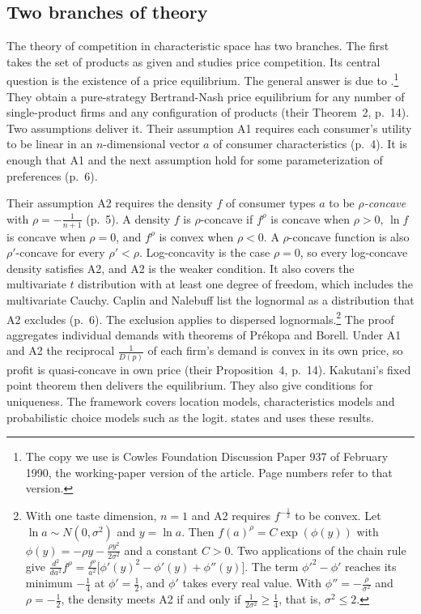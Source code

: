 \subsection{Two branches of theory}\label{sec:06-branches}

The theory of competition in characteristic space has two branches. The first takes the set of products as
given and studies price competition. Its central question is the existence of a price equilibrium. The
general answer is due to \citet{CaplinNalebuff1991}.\footnote{The copy we use is Cowles Foundation Discussion Paper
937 of February 1990, the working-paper version of the article. Page numbers refer to that version.} They obtain a
pure-strategy Bertrand-Nash price equilibrium for any number of single-product firms and any configuration of
products (their Theorem~2, p.~14). Two assumptions deliver it. Their assumption A1 requires each consumer's utility
to be linear in an $n$-dimensional vector $a$ of consumer characteristics (p.~4). It is enough that A1 and the
next assumption hold for some parameterization of preferences (p.~6).

Their assumption A2 requires the density $f$ of consumer types $a$ to be \emph{$\rho$-concave} with
$\rho = -\frac{1}{n+1}$ (p.~5). A density $f$ is $\rho$-concave if $f^\rho$ is concave when $\rho > 0$, $\ln f$ is
concave when $\rho = 0$, and $f^\rho$ is convex when $\rho < 0$. A $\rho$-concave function is also $\rho'$-concave for
every $\rho' < \rho$. Log-concavity is the case $\rho = 0$, so every log-concave density satisfies A2, and A2 is the
weaker condition. It also covers the multivariate $t$ distribution with at least one degree of freedom, which
includes the multivariate Cauchy. Caplin and Nalebuff list the lognormal as a distribution that A2 excludes
(p.~6). The exclusion applies to dispersed lognormals.\footnote{With one taste dimension, $n = 1$ and A2 requires
$f^{-\frac{1}{2}}$ to be convex. Let $\ln a \sim N(0, \sigma^2)$ and $y = \ln a$. Then
$f(a)^{\rho} = C\exp(\phi(y))$ with $\phi(y) = -\rho y - \frac{\rho y^2}{2\sigma^2}$ and a constant $C > 0$. Two
applications of the chain rule give
$\frac{d^2}{da^2}f^{\rho} = \frac{f^{\rho}}{a^2}\big[\phi'(y)^2 - \phi'(y) + \phi''(y)\big]$. The term
$\phi'^2 - \phi'$ reaches its minimum $-\frac{1}{4}$ at $\phi' = \frac{1}{2}$, and $\phi'$ takes every real value.
With $\phi'' = -\frac{\rho}{\sigma^2}$ and $\rho = -\frac{1}{2}$, the density meets A2 if and only if
$\frac{1}{2\sigma^2} \ge \frac{1}{4}$, that is, $\sigma^2 \le 2$.} The proof aggregates individual demands with
theorems of Pr\'ekopa and Borell. Under A1 and A2 the reciprocal $\frac{1}{D(p)}$ of each firm's demand is convex in
its own price, so profit is quasi-concave in own price (their Proposition~4, p.~14). Kakutani's fixed point theorem
then delivers the equilibrium. They also give conditions for uniqueness. The framework covers location models,
characteristics models and probabilistic choice models such as the logit.  states and uses these
results.

